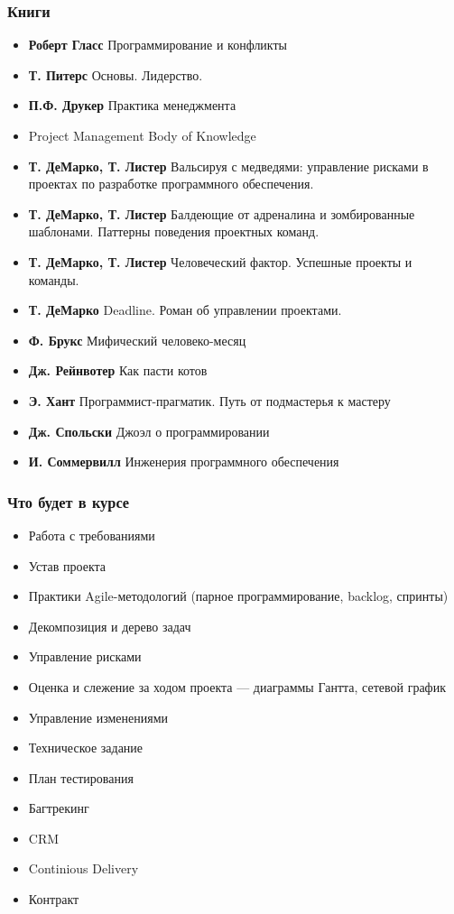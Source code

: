 \documentclass[xetex,mathserif,serif]{beamer}
\begin{document}
	\begin{frame}
		\frametitle{Книги}
		\begin{footnotesize}
			\begin{itemize}
				\item \textbf{Роберт Гласс} Программирование и конфликты
				\item \textbf{Т. Питерс} Основы. Лидерство.
				\item \textbf{П.Ф. Друкер} Практика менеджмента
				\item Project Management Body of Knowledge
				\item \textbf{Т. ДеМарко, Т. Листер} Вальсируя с медведями: управление рисками в проектах по разработке программного обеспечения.
				\item \textbf{Т. ДеМарко, Т. Листер} Балдеющие от адреналина и зомбированные шаблонами. Паттерны поведения проектных команд.
				\item \textbf{Т. ДеМарко, Т. Листер} Человеческий фактор. Успешные проекты и команды.
				\item \textbf{Т. ДеМарко} Deadline. Роман об управлении проектами.
				\item \textbf{Ф. Брукс} Мифический человеко-месяц
				\item \textbf{Дж. Рейнвотер} Как пасти котов
				\item \textbf{Э. Хант} Программист-прагматик. Путь от подмастерья к мастеру
				\item \textbf{Дж. Спольски} Джоэл о программировании
				\item \textbf{И. Соммервилл} Инженерия программного обеспечения
			\end{itemize}
		\end{footnotesize}
	\end{frame}

	\begin{frame}
		\frametitle{Что будет в курсе}
		\begin{footnotesize}
			\begin{itemize}
				\item Работа с требованиями
				\item Устав проекта
				\item Практики Agile-методологий (парное программирование, backlog, спринты)
				\item Декомпозиция и дерево задач
				\item Управление рисками
				\item Оценка и слежение за ходом проекта --- диаграммы Гантта, сетевой график
				\item Управление изменениями
				\item Техническое задание
				\item План тестирования
				\item Багтрекинг
				\item CRM
				\item Continious Delivery
				\item Контракт
			\end{itemize}
		\end{footnotesize}
	\end{frame}
\end{document}
